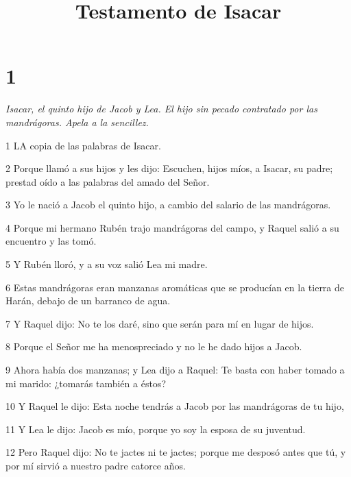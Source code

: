 

\title{Testamento de Isacar}

\chapter{1}

\par \textit{Isacar, el quinto hijo de Jacob y Lea. El hijo sin pecado contratado por las mandrágoras. Apela a la sencillez.}

\par 1 LA copia de las palabras de Isacar.

\par 2 Porque llamó a sus hijos y les dijo: Escuchen, hijos míos, a Isacar, su padre; prestad oído a las palabras del amado del Señor.

\par 3 Yo le nació a Jacob el quinto hijo, a cambio del salario de las mandrágoras.

\par 4 Porque mi hermano Rubén trajo mandrágoras del campo, y Raquel salió a su encuentro y las tomó.

\par 5 Y Rubén lloró, y a su voz salió Lea mi madre.

\par 6 Estas mandrágoras eran manzanas aromáticas que se producían en la tierra de Harán, debajo de un barranco de agua.

\par 7 Y Raquel dijo: No te los daré, sino que serán para mí en lugar de hijos.

\par 8 Porque el Señor me ha menospreciado y no le he dado hijos a Jacob.

\par 9 Ahora había dos manzanas; y Lea dijo a Raquel: Te basta con haber tomado a mi marido: ¿tomarás también a éstos?

\par 10 Y Raquel le dijo: Esta noche tendrás a Jacob por las mandrágoras de tu hijo,

\par 11 Y Lea le dijo: Jacob es mío, porque yo soy la esposa de su juventud.

\par 12 Pero Raquel dijo: No te jactes ni te jactes; porque me desposó antes que tú, y por mí sirvió a nuestro padre catorce años.

